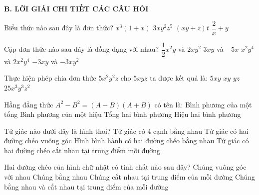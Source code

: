 \documentclass[12pt,a4paper]{article}
\begin{document}
\noindent\textbf{\large B. LỜI GIẢI CHI TIẾT CÁC CÂU HỎI}
\vspace{1mm}
\begin{ex}
Biểu thức nào sau đây là đơn thức?
\choice
{$x^3(1 + x)$}
{\True $3xy^2z^5$}
{$(xy + z)t$}
{$\dfrac{2}{x} + y$}
\end{ex}

\begin{ex}
Cặp đơn thức nào sau đây là đồng dạng với nhau?
\choice
{$\dfrac{1}{2}x^2y$ và $2xy^2$}
{$3xy$ và $-5x$}
{\True $x^2y^4$ và $2x^2y^4$}
{$-3xy$ và $-3xy^2$}
\end{ex}

\begin{ex}
Thực hiện phép chia đơn thức $5x^2y^2z$ cho $5xyz$ ta được kết quả là:
\choice
{$5xy$}
{\True $xy$}
{$yz$}
{$25x^3y^3z^2$}
\end{ex}

\begin{ex}
Hằng đẳng thức $A^2 - B^2 = (A - B)(A + B)$ có tên là:
\choice
{Bình phương của một tổng}
{Bình phương của một hiệu}
{Tổng hai bình phương}
{\True Hiệu hai bình phương}
\end{ex}

\begin{ex}
Tứ giác nào dưới đây là hình thoi?
\choice
{\True Tứ giác có 4 cạnh bằng nhau}
{Tứ giác có hai đường chéo vuông góc}
{Hình bình hành có hai đường chéo bằng nhau}
{Tứ giác có hai đường chéo cắt nhau tại trung điểm mỗi đường}
\end{ex}

\begin{ex}
Hai đường chéo của hình chữ nhật có tính chất nào sau đây?
\choice
{Chúng vuông góc với nhau}
{Chúng bằng nhau}
{Chúng cắt nhau tại trung điểm của mỗi đường}
{\True Chúng bằng nhau và cắt nhau tại trung điểm của mỗi đường}
\end{ex}
\end{document}
